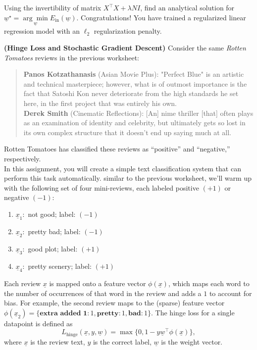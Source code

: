 \documentclass{article}
\theoremstyle{definition}
\begin{document}
\begin{question}[start=0]
\begin{question}
			\item Using the invertibility of matrix $X^\top X + \lambda N  I$, find an analytical solution for $\underline{w}^\star = \underset{\underline{w}}{\arg \min} E_{\text{in}}(\underline{w})$. Congratulations! You have trained a regularized linear regression model with an $\ell_2$ regularization penalty.
		\end{question}
		\item \textbf{(Hinge Loss and Stochastic Gradient Descent)} Consider the same \textit{Rotten Tomatoes} reviews in the previous worksheet:
		\begin{quote}
			\textbf{Panos Kotzathanasis} (Asian Movie Plus): "Perfect Blue" is an artistic and technical masterpiece; however, what is of outmost importance is the fact that Satoshi Kon never deteriorate from the high standards he set here, in the first project that was entirely his own.\\
			
			\textbf{Derek Smith} (Cinematic Reflections): [An] nime thriller [that] often plays as an examination of identity and celebrity, but ultimately gets so lost in its own complex structure that it doesn't end up saying much at all.
		\end{quote}
		
		Rotten Tomatoes has classified these reviews as ``positive'' and ``negative,'' respectively.\\
		
		In this assignment, you will create a simple text classification system that can perform this task automatically. similar to the previous worksheet, we'll warm up with the following set of four mini-reviews, each labeled positive $(+1)$ or negative $(-1)$:
		\begin{enumerate}
			\item $\underline{x}_1:$ not good; label: $(-1)$
			\item $\underline{x}_2:$ pretty bad; label: $(-1)$
			\item $\underline{x}_3:$ good plot; label: $(+1)$
			\item $\underline{x}_4:$ pretty scenery; label: $(+1)$
		\end{enumerate}
		
		Each review $\underline{x}$ is mapped onto a feature vector $\phi(\underline{x})$, which maps each word to the number of occurrences of that word in the review and adds a $1$ to account for bias. For example, the second review maps to the (sparse) feature vector $\phi(\underline{x}_2)=\{\textbf{extra added 1}:1, \textbf{pretty}:1,\textbf{bad}:1\}$. The hinge loss for a single datapoint is defined as
		\begin{equation*}
			L_{\text{hinge}}(\underline{x}, y,\underline{w})= \max\{0, 1-y\underline{w}^\top\phi(\underline{x})\},
		\end{equation*}
		where $\underline{x}$ is the review text, $y$ is the correct label, $\underline{w}$ is the weight vector.\\


\end{question}
\end{document}
